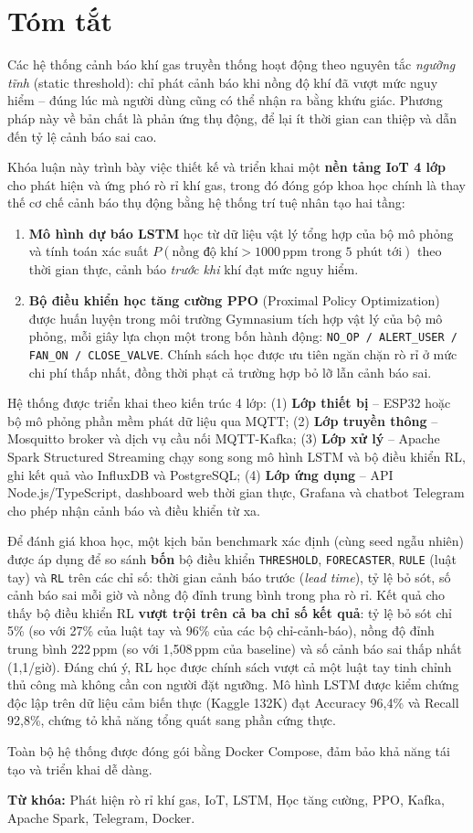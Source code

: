 \chapter*{Tóm tắt}

Các hệ thống cảnh báo khí gas truyền thống hoạt động theo nguyên tắc \textit{ngưỡng tĩnh} (static threshold): chỉ phát cảnh báo khi nồng độ khí đã vượt mức nguy hiểm – đúng lúc mà người dùng cũng có thể nhận ra bằng khứu giác. Phương pháp này về bản chất là phản ứng thụ động, để lại ít thời gian can thiệp và dẫn đến tỷ lệ cảnh báo sai cao.

Khóa luận này trình bày việc thiết kế và triển khai một \textbf{nền tảng IoT 4 lớp} cho phát hiện và ứng phó rò rỉ khí gas, trong đó đóng góp khoa học chính là thay thế cơ chế cảnh báo thụ động bằng hệ thống trí tuệ nhân tạo hai tầng:

\begin{enumerate}
  \item \textbf{Mô hình dự báo LSTM} học từ dữ liệu vật lý tổng hợp của bộ mô phỏng và tính toán xác suất $P(\text{nồng độ khí} > 1000\,\text{ppm trong 5 phút tới})$ theo thời gian thực, cảnh báo \textit{trước khi} khí đạt mức nguy hiểm.

  \item \textbf{Bộ điều khiển học tăng cường PPO} (Proximal Policy Optimization) được huấn luyện trong môi trường Gymnasium tích hợp vật lý của bộ mô phỏng, mỗi giây lựa chọn một trong bốn hành động: \texttt{NO\_OP / ALERT\_USER / FAN\_ON / CLOSE\_VALVE}. Chính sách học được ưu tiên ngăn chặn rò rỉ ở mức chi phí thấp nhất, đồng thời phạt cả trường hợp bỏ lỡ lẫn cảnh báo sai.
\end{enumerate}

Hệ thống được triển khai theo kiến trúc 4 lớp: (1) \textbf{Lớp thiết bị} – ESP32 hoặc bộ mô phỏng phần mềm phát dữ liệu qua MQTT; (2) \textbf{Lớp truyền thông} – Mosquitto broker và dịch vụ cầu nối MQTT-Kafka; (3) \textbf{Lớp xử lý} – Apache Spark Structured Streaming chạy song song mô hình LSTM và bộ điều khiển RL, ghi kết quả vào InfluxDB và PostgreSQL; (4) \textbf{Lớp ứng dụng} – API Node.js/TypeScript, dashboard web thời gian thực, Grafana và chatbot Telegram cho phép nhận cảnh báo và điều khiển từ xa.

Để đánh giá khoa học, một kịch bản benchmark xác định (cùng seed ngẫu nhiên) được áp dụng để so sánh \textbf{bốn} bộ điều khiển \texttt{THRESHOLD}, \texttt{FORECASTER}, \texttt{RULE} (luật tay) và \texttt{RL} trên các chỉ số: thời gian cảnh báo trước (\textit{lead time}), tỷ lệ bỏ sót, số cảnh báo sai mỗi giờ và nồng độ đỉnh trung bình trong pha rò rỉ. Kết quả cho thấy bộ điều khiển RL \textbf{vượt trội trên cả ba chỉ số kết quả}: tỷ lệ bỏ sót chỉ 5\% (so với 27\% của luật tay và 96\% của các bộ chỉ-cảnh-báo), nồng độ đỉnh trung bình 222\,ppm (so với 1{,}508\,ppm của baseline) và số cảnh báo sai thấp nhất (1{,}1/giờ). Đáng chú ý, RL học được chính sách vượt cả một luật tay tinh chỉnh thủ công mà không cần con người đặt ngưỡng. Mô hình LSTM được kiểm chứng độc lập trên dữ liệu cảm biến thực (Kaggle 132K) đạt Accuracy 96{,}4\% và Recall 92{,}8\%, chứng tỏ khả năng tổng quát sang phần cứng thực.

Toàn bộ hệ thống được đóng gói bằng Docker Compose, đảm bảo khả năng tái tạo và triển khai dễ dàng.

\bigskip
\noindent\textbf{Từ khóa:} Phát hiện rò rỉ khí gas, IoT, LSTM, Học tăng cường, PPO, Kafka, Apache Spark, Telegram, Docker.
